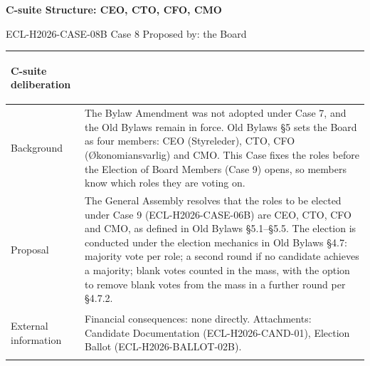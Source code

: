 \documentclass{../../../Common/Latex/Templates/rapport}
\begin{document}
\reportmainmatter
\small
\setlength{\parindent}{0pt}
\setlength{\tabcolsep}{6pt}
\renewcommand{\arraystretch}{1.2}

\begin{center}
  {\Large\bfseries C-suite Structure: CEO, CTO, CFO, CMO}\par
  \vspace{0.15cm}
  {\normalsize ECL-H2026-CASE-08B \textperiodcentered{} Case 8 \textperiodcentered{} Proposed by: the Board}\par
  \vspace{0.1cm}
  {\small \meetingline}\par
\end{center}

\vspace{0.3cm}
\begin{tabularx}{\textwidth}{|>{\bfseries\raggedright\arraybackslash}p{4.2cm}|X|}
  \hline
  C-suite deliberation & \rule{0pt}{4.1cm} \\
  \hline
  Background           & The Bylaw Amendment was not adopted under Case 7, and the Old Bylaws remain in force. Old Bylaws \S5 sets the Board as four members: CEO (Styreleder), CTO, CFO (Økonomiansvarlig) and CMO. This Case fixes the roles before the Election of Board Members (Case 9) opens, so members know which roles they are voting on. \\
  \hline
  Proposal             & The General Assembly resolves that the roles to be elected under Case 9 (ECL-H2026-CASE-06B) are CEO, CTO, CFO and CMO, as defined in Old Bylaws \S5.1--\S5.5. The election is conducted under the election mechanics in Old Bylaws \S4.7: majority vote per role; a second round if no candidate achieves a majority; blank votes counted in the mass, with the option to remove blank votes from the mass in a further round per \S4.7.2. \\
  \hline
  External information & Financial consequences: none directly. Attachments: Candidate Documentation (ECL-H2026-CAND-01), Election Ballot (ECL-H2026-BALLOT-02B). \\
  \hline
\end{tabularx}
\end{document}
